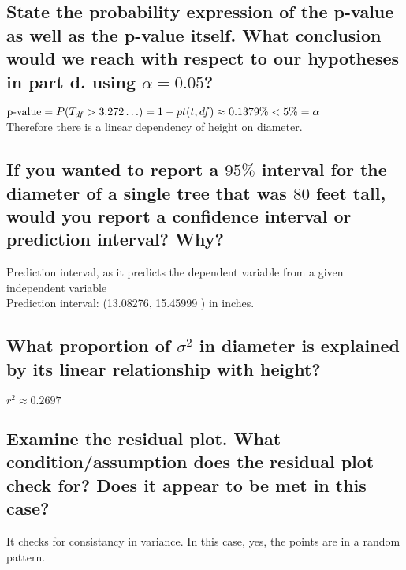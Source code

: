\begin{multicols}{2}
        \subsection{State the probability expression of the p-value as well as the p-value itself. What
            conclusion would we reach with respect to our hypotheses in part d. using $\alpha = 0.05$?}
            $\text{p-value} = P(T_{df} > 3.272\hdots) = 1 - pt(t, df) 
            \approx 0.1379\% < 5\% = \alpha$\\
            Therefore there is a linear dependency of height on diameter.

        \subsection{If you wanted to report a $95\%$ interval for the diameter of a single tree that was $80$
            feet tall, would you report a confidence interval or prediction interval? Why?}
            Prediction interval, as it predicts the dependent variable 
            from a given independent variable\\
            Prediction interval: (13.08276, 15.45999 ) in inches.

        \subsection{What proportion of $\sigma^2$ in diameter is explained by its linear relationship with
            height?}
            $r^2 \approx 0.2697$

        \subsection{Examine the residual plot. What condition/assumption does the residual plot check for?
            Does it appear to be met in this case?}
            It checks for consistancy in variance. 
            In this case, yes, the points are in a random pattern.
            \begin{center}
                
            \end{center}
    \end{multicols}